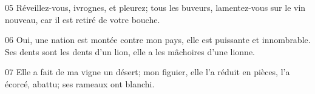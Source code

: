 
05 Réveillez-vous, ivrognes, et pleurez; tous les buveurs, lamentez-vous sur le vin nouveau, car il est retiré de votre bouche.

06 Oui, une nation est montée contre mon pays, elle est puissante et innombrable. Ses dents sont les dents d’un lion, elle a les mâchoires d’une lionne.

07 Elle a fait de ma vigne un désert; mon figuier, elle l’a réduit en pièces, l’a écorcé, abattu; ses rameaux ont blanchi.
